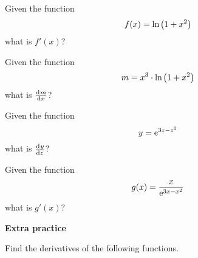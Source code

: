 
\begin{ProblemSet}[pencil space=3in]
 \begin{Problem}
  Given the function
  \begin{equation*}
   f(x) = \mathrm{ln}\hspace{-0.1ex}\left(1 + x^2\right)
  \end{equation*}
  what is $f'(x)$?
 \end{Problem}

 \begin{Problem}
  Given the function
  \begin{equation*}
   m = x^3 \cdot \mathrm{ln}\hspace{-0.1ex}\left(1 + x^2\right)
  \end{equation*}
  what is $\frac{\mathrm{d}^{{}}m}{\mathrm{d} x^{{}}}$?
 \end{Problem}

 \begin{Problem}
  Given the function
  \begin{equation*}
   y = \mathrm{e}^{3z-z^2}
  \end{equation*}
  what is $\frac{\mathrm{d}^{{}}y}{\mathrm{d} z^{{}}}$?
 \end{Problem}

 \begin{Problem}
  Given the function
  \begin{equation*}
   g(x) = \frac{x}{\mathrm{e}^{3x-x^2}}
  \end{equation*}
  what is $g'(x)$?
 \end{Problem}
\end{ProblemSet}

\newpage

\textbf{Extra practice}

Find the derivatives of the following functions.

\begin{multicols}{2}
 \begin{ProblemSet}[pencil space=0.25in]
 \end{ProblemSet}
\end{multicols}

